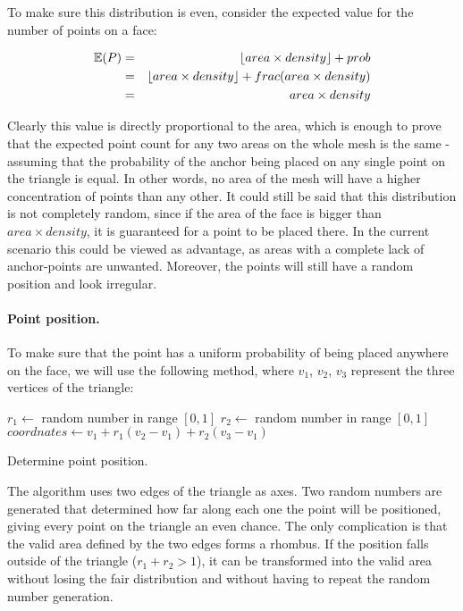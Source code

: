 \documentclass[a4paper,10pt]{article}
\DeclarePairedDelimiter{\floor}{\lfloor}{\rfloor}
\begin{document}
\noindent
To make sure this distribution is even, consider the expected value for the number of points on a face:

\begin{eqnarray*}
\mathbb{E} (P) & = & \floor{area \times density} + prob \\
& = & \floor{area \times density} + frac(area \times density) \\
& = & area \times density
\end{eqnarray*}

\noindent
Clearly this value is directly proportional to the area, which is enough to prove that the expected point count for any two areas on the whole mesh is the same - assuming that the probability of the anchor being placed on any single point on the triangle is equal. In other words, no area of the mesh will have a higher concentration of points than any other. It could still be said that this distribution is not completely random, since if the area of the face is bigger than $area \times density$, it is guaranteed for a point to be placed there. In the current scenario this could be viewed as advantage, as areas with a complete lack of anchor-points are unwanted. Moreover, the points will still have a random position and look irregular.

\paragraph{Point position.}
To make sure that the point has a uniform probability of being placed anywhere on the face, we will use the following method, where $v_1$, $v_2$, $v_3$ represent the three vertices of the triangle:

\begin{algorithm}[H]
  $r_1 \leftarrow$ random number in range $[0,1]$\;
  $r_2 \leftarrow$ random number in range $[0,1]$\;
  $coordnates \leftarrow v_1 + r_1(v_2-v_1) + r_2(v_3-v_1)$
  \caption{Determine point position.}
\end{algorithm}

\noindent
The algorithm uses two edges of the triangle as axes. Two random numbers are generated that determined how far along each one the point will be positioned, giving every point on the triangle an even chance. The only complication is that the valid area defined by the two edges forms a rhombus. If the position falls outside of the triangle ($r_1 + r_2 > 1$), it can be transformed into the valid area without losing the fair distribution and without having to repeat the random number generation.\\
\end{document}
